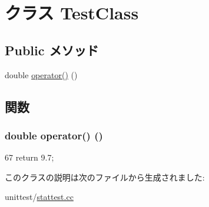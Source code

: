 \hypertarget{classTestClass}{
\section{クラス TestClass}
\label{classTestClass}
}
\subsection*{Public メソッド}
\begin{DoxyCompactItemize}
\item 
double \hyperlink{classTestClass_a8ba58318b0e39bc2e453dd4dcac1f00f}{operator()} ()
\end{DoxyCompactItemize}


\subsection{関数}
\hypertarget{classTestClass_a8ba58318b0e39bc2e453dd4dcac1f00f}{
\subsubsection[{operator()}]{\setlength{\rightskip}{0pt plus 5cm}double operator() ()}}
\label{classTestClass_a8ba58318b0e39bc2e453dd4dcac1f00f}



\begin{DoxyCode}
67 { return 9.7; }
\end{DoxyCode}


このクラスの説明は次のファイルから生成されました:\begin{DoxyCompactItemize}
\item 
unittest/\hyperlink{stattest_8cc}{stattest.cc}\end{DoxyCompactItemize}
